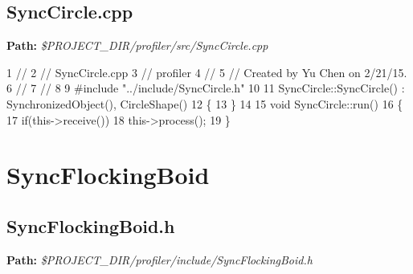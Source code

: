  \hypertarget{_benchmark_program_BenchmarkProgramSyncCircle_cpp}{}\subsection{Sync\+Circle.\+cpp}\label{_benchmark_program_BenchmarkProgramSyncCircle_cpp}
{\bfseries Path\+:} {\itshape \$\+P\+R\+O\+J\+E\+C\+T\+\_\+\+D\+I\+R/profiler/src/\+Sync\+Circle.cpp} 
\begin{DoxyCodeInclude}
1 \textcolor{comment}{//}
2 \textcolor{comment}{//  SyncCircle.cpp}
3 \textcolor{comment}{//  profiler}
4 \textcolor{comment}{//}
5 \textcolor{comment}{//  Created by Yu Chen on 2/21/15.}
6 \textcolor{comment}{//}
7 \textcolor{comment}{//}
8 
9 \textcolor{preprocessor}{#include "../include/SyncCircle.h"}
10 
11 SyncCircle::SyncCircle()  : SynchronizedObject(), CircleShape()
12 \{
13 \}
14 
15 \textcolor{keywordtype}{void} SyncCircle::run()
16 \{
17     \textcolor{keywordflow}{if}(this->receive())
18         this->process();
19 \}
\end{DoxyCodeInclude}
 \hypertarget{_benchmark_program_BenchmarkProgramSyncFlockingBoid}{}\section{Sync\+Flocking\+Boid}\label{_benchmark_program_BenchmarkProgramSyncFlockingBoid}
\hypertarget{_benchmark_program_BenchmarkProgramSyncFlockingBoid_h}{}\subsection{Sync\+Flocking\+Boid.\+h}\label{_benchmark_program_BenchmarkProgramSyncFlockingBoid_h}
{\bfseries Path\+:} {\itshape \$\+P\+R\+O\+J\+E\+C\+T\+\_\+\+D\+I\+R/profiler/include/\+Sync\+Flocking\+Boid.h} 
